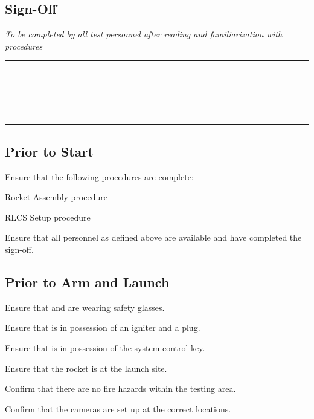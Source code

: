 \subsection{Sign-Off}
\textit{To be completed by all test personnel after reading and familiarization with procedures}
\begin{checklist}
  \item \opsfull{}    \tabto{25em}\rule{10em}{0.4pt}\hspace{5em}\rule{10em}{0.4pt}
  \item \primaryfull{}  \tabto{25em}\rule{10em}{0.4pt}\hspace{5em}\rule{10em}{0.4pt}
  \item \secondaryfull{}\tabto{25em}\rule{10em}{0.4pt}\hspace{5em}\rule{10em}{0.4pt}
  \item \controlfull{}  \tabto{25em}\rule{10em}{0.4pt}\hspace{5em}\rule{10em}{0.4pt}
\end{checklist}
\setcounter{checklistnum}{0}

\newpage
\subsection{Prior to Start}
\begin{checklist}
  \item Ensure that the following procedures are complete:
  \begin{checklist}
    \item Rocket Assembly procedure
    \item RLCS Setup procedure
  \end{checklist}
  \item Ensure that all personnel as defined above are available and have completed the sign-off.
\end{checklist}
\setcounter{checklistnum}{0}

\subsection{Prior to Arm and Launch}
\begin{checklist}
  \item Ensure that \primary{} and \secondary{} are wearing safety glasses.
  \item Ensure that \primary{} is in possession of an igniter and a plug.
  \item Ensure that \ops{} is in possession of the system control key.
  \item Ensure that the rocket is at the launch site.
  \item Confirm that there are no fire hazards within the testing area.
  \item Confirm that the cameras are set up at the correct locations. 
\end{checklist}
\setcounter{checklistnum}{0}

